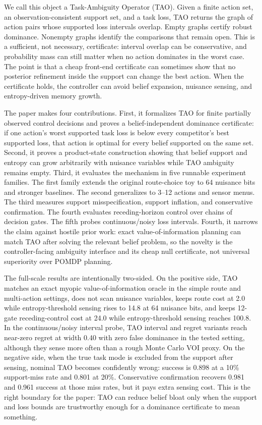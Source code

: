 \documentclass{article}
\begin{document}
We call this object a Task-Ambiguity Operator (TAO). Given a finite action set, an observation-consistent support set, and a task loss, TAO returns the graph of action pairs whose supported loss intervals overlap. Empty graphs certify robust dominance. Nonempty graphs identify the comparisons that remain open. This is a sufficient, not necessary, certificate: interval overlap can be conservative, and probability mass can still matter when no action dominates in the worst case. The point is that a cheap front-end certificate can sometimes show that no posterior refinement inside the support can change the best action. When the certificate holds, the controller can avoid belief expansion, nuisance sensing, and entropy-driven memory growth.

The paper makes four contributions. First, it formalizes TAO for finite partially observed control decisions and proves a belief-independent dominance certificate: if one action's worst supported task loss is below every competitor's best supported loss, that action is optimal for every belief supported on the same set. Second, it proves a product-state construction showing that belief support and entropy can grow arbitrarily with nuisance variables while TAO ambiguity remains empty. Third, it evaluates the mechanism in five runnable experiment families. The first family extends the original route-choice toy to 64 nuisance bits and stronger baselines. The second generalizes to 3--12 actions and sensor menus. The third measures support misspecification, support inflation, and conservative confirmation. The fourth evaluates receding-horizon control over chains of decision gates. The fifth probes continuous/noisy loss intervals. Fourth, it narrows the claim against hostile prior work: exact value-of-information planning can match TAO after solving the relevant belief problem, so the novelty is the controller-facing ambiguity interface and its cheap null certificate, not universal superiority over POMDP planning.

The full-scale results are intentionally two-sided. On the positive side, TAO matches an exact myopic value-of-information oracle in the simple route and multi-action settings, does not scan nuisance variables, keeps route cost at 2.0 while entropy-threshold sensing rises to 14.8 at 64 nuisance bits, and keeps 12-gate receding-control cost at 24.0 while entropy-threshold sensing reaches 100.8. In the continuous/noisy interval probe, TAO interval and regret variants reach near-zero regret at width 0.40 with zero false dominance in the tested setting, although they sense more often than a rough Monte Carlo VOI proxy. On the negative side, when the true task mode is excluded from the support after sensing, nominal TAO becomes confidently wrong: success is 0.898 at a 10\% support-miss rate and 0.801 at 20\%. Conservative confirmation recovers 0.981 and 0.961 success at those miss rates, but it pays extra sensing cost. This is the right boundary for the paper: TAO can reduce belief bloat only when the support and loss bounds are trustworthy enough for a dominance certificate to mean something.
\end{document}

